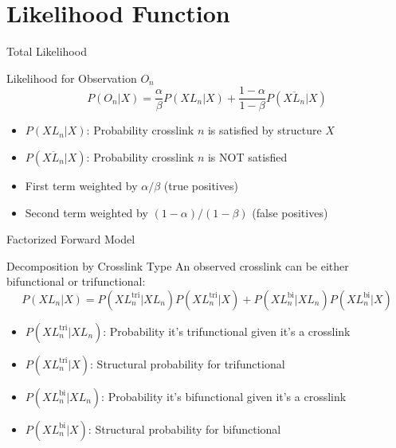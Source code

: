 \documentclass{beamer}
\begin{document}
\section{Likelihood Function}

\begin{frame}{Total Likelihood}
\begin{block}{Likelihood for Observation $O_n$}
\begin{equation}
    \boxed{P(O_n|X) = \frac{\alpha}{\beta}P(XL_n|X) + \frac{1-\alpha}{1-\beta}P(\overline{XL_n}|X)}
\end{equation}
\end{block}

\vspace{0.5cm}

\begin{itemize}
    \item $P(XL_n|X)$: Probability crosslink $n$ is satisfied by structure $X$
    \item $P(\overline{XL_n}|X)$: Probability crosslink $n$ is NOT satisfied
    \item First term weighted by $\alpha/\beta$ (true positives)
    \item Second term weighted by $(1-\alpha)/(1-\beta)$ (false positives)
\end{itemize}
\end{frame}

\begin{frame}{Factorized Forward Model}
\begin{block}{Decomposition by Crosslink Type}
An observed crosslink can be either bifunctional or trifunctional:
\begin{equation}
    \boxed{P(XL_n|X) = P(XL^{\text{tri}}_n|XL_n)P(XL^{\text{tri}}_n|X) + P(XL^{\text{bi}}_n|XL_n)P(XL^{\text{bi}}_n|X)}
\end{equation}
\end{block}

\vspace{0.3cm}

\begin{itemize}
    \item $P(XL^{\text{tri}}_n|XL_n)$: Probability it's trifunctional given it's a crosslink
    \item $P(XL^{\text{tri}}_n|X)$: Structural probability for trifunctional
    \item $P(XL^{\text{bi}}_n|XL_n)$: Probability it's bifunctional given it's a crosslink
    \item $P(XL^{\text{bi}}_n|X)$: Structural probability for bifunctional
\end{itemize}
\end{frame}
\end{document}

